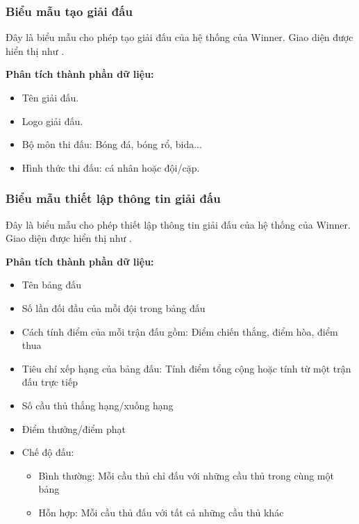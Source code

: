 \subsubsection{Biểu mẫu tạo giải đấu}

Đây là biểu mẫu cho phép tạo giải đấu của hệ thống của Winner.
Giao diện được hiển thị như .

\noindent
\textbf{Phân tích thành phần dữ liệu:}
\begin{itemize}[leftmargin=1.5cm, label={--}]
  \item Tên giải đấu.
  \item Logo giải đấu.
  \item Bộ môn thi đấu: Bóng đá, bóng rổ, bida...
  \item Hình thức thi đấu: cá nhân hoặc đội/cặp.

\end{itemize}

\subsubsection{Biểu mẫu thiết lập thông tin giải đấu}

Đây là biểu mẫu cho phép thiết lập thông tin giải đấu của hệ thống của Winner.
Giao diện được hiển thị như .

\noindent
\textbf{Phân tích thành phần dữ liệu:}
\begin{itemize}[leftmargin=1.5cm, label={--}]
  \item Tên bảng đấu
  \item Số lần đối đầu của mỗi đội trong bảng đấu
  \item Cách tính điểm của mỗi trận đấu gồm: Điểm chiến thắng, điểm hòa, điểm thua
  \item Tiêu chí xếp hạng của bảng đấu: Tính điểm tổng cộng hoặc tính từ một trận đấu trực tiếp
  \item Số cầu thủ thắng hạng/xuống hạng
  \item Điểm thưởng/điểm phạt
  \item Chế độ đấu:
        \begin{itemize}[label={+}]
          \item Bình thường: Mỗi cầu thủ chỉ đấu với những cầu thủ trong cùng một bảng
          \item Hỗn hợp: Mỗi cầu thủ đấu với tất cả những cầu thủ khác

        \end{itemize}

\end{itemize}
